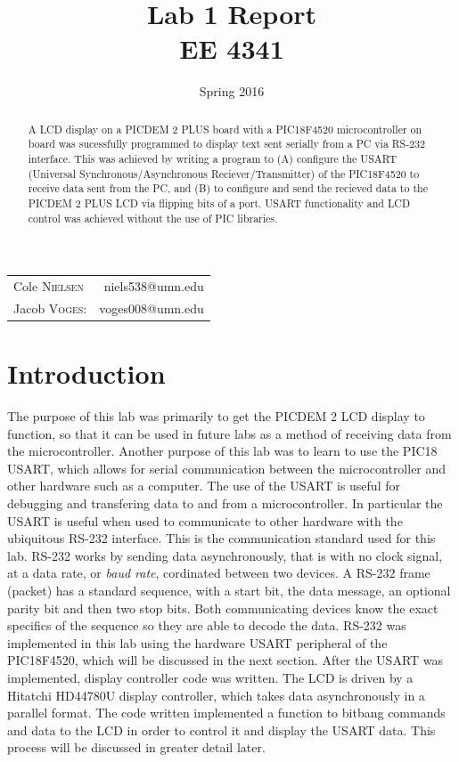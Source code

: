 \documentclass[12pt]{article}
\title{Lab 1 Report\\ \vspace{0.3 in} EE 4341}
\date{Spring 2016}
\begin{document}
\maketitle 
\begin{center}
 \begin{tabular}{l r}
   Cole \textsc{Nielsen} & niels538@umn.edu\\ 
   Jacob \textsc{Voges}: & voges008@umn.edu\\ 
\end{tabular}
\end{center}
\pagebreak
\pagebreak
\begin{abstract}
\noindent A LCD display on a PICDEM 2 PLUS board with a PIC18F4520 microcontroller on board was sucessfully programmed to display text sent serially from a PC via RS-232 interface. This was achieved by writing a program to (A) configure the USART (Universal Synchronous/Asynchronous Reciever/Transmitter) of the PIC18F4520 to receive data sent from the PC, and (B) to configure and send the recieved data to the PICDEM 2 PLUS LCD via flipping bits of a port. USART functionality and LCD control was achieved without the use of PIC libraries.
\end{abstract}
\hrulefill
\section{Introduction}
The purpose of this lab was primarily to get the PICDEM 2 LCD display to function, so that it can be used in future labs as a method of receiving data from the microcontroller. Another purpose of this lab was to learn to use the PIC18 USART, which allows for serial communication between the microcontroller and other hardware such as a computer. The use of the USART is useful for debugging and transfering data to and from a microcontroller. In particular the USART is useful when used to communicate to other hardware with the ubiquitous RS-232 interface. This is the communication standard used for this lab. RS-232 works by sending data asynchronously, that is with no clock signal, at a data rate, or \textit{baud rate}, cordinated between two devices. A RS-232 frame (packet) has a standard  sequence, with a start bit, the data message, an optional parity bit and then two stop bits. Both communicating devices know the exact specifics of the sequence so they are able to decode the data. RS-232 was implemented in this lab using the hardware USART peripheral of the PIC18F4520, which will be discussed in the next section. After the USART was implemented, display controller code was written. The LCD is driven by a Hitatchi HD44780U display controller, which takes data asynchronously in a parallel format. The code written implemented a function to bitbang commands and data to the LCD in order to control it and display the USART data. This process will be discussed in greater detail later. 
\end{document}
